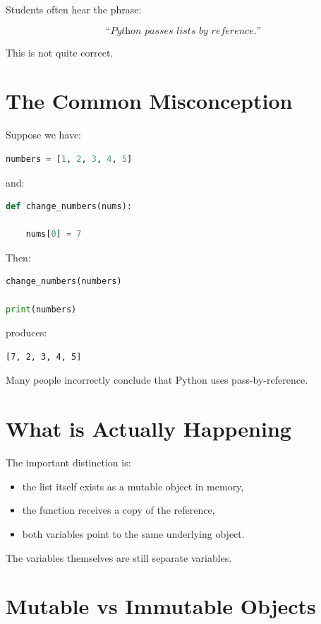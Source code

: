 \documentclass[11pt]{article}
\begin{document}
Students often hear the phrase:

\[
\textit{``Python passes lists by reference.''}
\]

This is not quite correct.

\section{The Common Misconception}

Suppose we have:

\begin{lstlisting}[language=Python]
numbers = [1, 2, 3, 4, 5]
\end{lstlisting}

and:

\begin{lstlisting}[language=Python]
def change_numbers(nums):

    nums[0] = 7
\end{lstlisting}

Then:

\begin{lstlisting}[language=Python]
change_numbers(numbers)

print(numbers)
\end{lstlisting}

produces:

\begin{lstlisting}
[7, 2, 3, 4, 5]
\end{lstlisting}

Many people incorrectly conclude that Python uses pass-by-reference.

\section{What is Actually Happening}

The important distinction is:

\begin{itemize}
    \item the list itself exists as a mutable object in memory,
    \item the function receives a copy of the reference,
    \item both variables point to the same underlying object.
\end{itemize}

The variables themselves are still separate variables.

\section{Mutable vs Immutable Objects}
\end{document}
